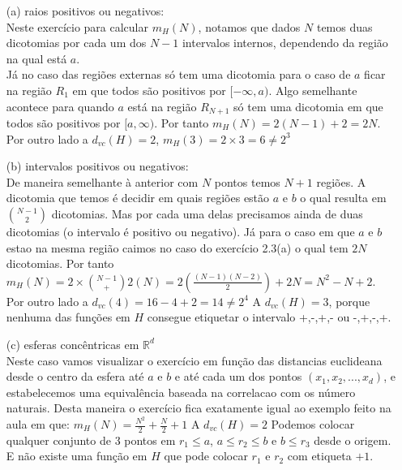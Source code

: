 \begin{enumerate}
    \item[(a)] raios positivos ou negativos: \\
    Neste exercício para calcular $m_H(N)$, notamos que dados $N$
    temos duas dicotomias por cada um dos $N-1$ intervalos internos, dependendo 
    da região na qual está $a$.\\ 
    Já no caso das regiões externas só tem 
    uma dicotomia para o caso de $a$ ficar na região $R_1$ em que todos são
    positivos por  $[-\infty, a)$. Algo semelhante acontece para quando $a$ está na região $R_{N+1}$
    só tem uma dicotomia em que todos são positivos por $[a,\infty)$. 
    Por tanto  $m_H(N) = 2(N-1)+2 = 2N$. Por outro lado a $d_{vc}(H)=2$, $m_H(3)= 2\times 3 = 6 \neq 2^3$\\

    \item[(b)] intervalos positivos ou negativos:\\
    De maneira semelhante à anterior com $N$ pontos temos $N+1$ regiões. A dicotomia
    que temos é decidir em quais regiões estão $a$ e $b$ o qual resulta em $\binom {N-1} {2}$ dicotomias.
    Mas por cada uma delas precisamos ainda de duas dicotomias (o intervalo é positivo ou negativo). 
    Já para o caso em que $a$ e $b$ estao na mesma região caimos no caso do exercício 2.3(a) o qual tem $2N$ 
    dicotomias.
    Por tanto $m_H(N) = 2\times \binom {N-1} +2(N) = 2 (\frac{(N-1)(N-2)}{2}) + 2N =
    N^2 - N + 2$.
    Por outro lado a $d_{vc}(4)= 16-4+2=14 \neq 2^4$
    A $d_{vc}(H)= 3$, porque nenhuma das funções em $H$ consegue etiquetar
    o intervalo +,-,+,- ou -,+,-,+.\\

    \item[(c)] esferas concêntricas em $\mathbb{R}^d$\\

    Neste caso vamos visualizar o exercício em função  das distancias euclideana desde o centro da esfera
    até $a$ e $b$ e até cada um dos pontos $(x_1,x_2, ..., x_d)$, e estabelecemos uma equivalência baseada na correlacao 
    com os número naturais. Desta maneira o exercício fica exatamente igual ao exemplo feito na aula 
    em que: $ m_H(N) =\frac{N^2}{2} + \frac{N}{2} + 1$
    A $d_{vc}(H)= 2$
    Podemos colocar qualquer conjunto de 3 pontos em $r_1 \leq a$,
    $a \leq r_2 \leq b$ e $b \leq r_3$ desde o origem. 
    E não existe uma função em $H$ que pode colocar $r_1$ e $r_2$ com etiqueta $+1$.
\end{enumerate}
